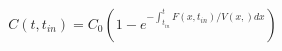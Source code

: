 \begin{equation}
C(t,t_{in}) = C_0\left(1-e^{-\int_{t_{in}}^t F(x,t_{in})/V(x,) dx} \right)
\end{equation}